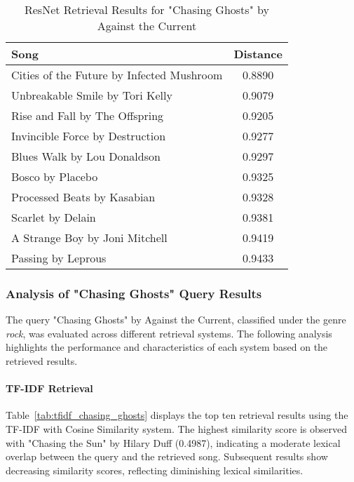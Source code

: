 \documentclass[sigconf]{acmart}
\begin{document}
\begin{table}[ht]
    \centering
    \caption{ResNet Retrieval Results for "Chasing Ghosts" by Against the Current}
    \label{tab:resnet_chasing_ghosts}
    \begin{tabular}{lc}
        \toprule
        \textbf{Song}                        & \textbf{Distance} \\
        \midrule
        Cities of the Future by Infected Mushroom & 0.8890                      \\
        Unbreakable Smile by Tori Kelly           & 0.9079                      \\
        Rise and Fall by The Offspring            & 0.9205                      \\
        Invincible Force by Destruction           & 0.9277                      \\
        Blues Walk by Lou Donaldson                & 0.9297                      \\
        Bosco by Placebo                           & 0.9325                      \\
        Processed Beats by Kasabian                & 0.9328                      \\
        Scarlet by Delain                          & 0.9381                      \\
        A Strange Boy by Joni Mitchell             & 0.9419                      \\
        Passing by Leprous                          & 0.9433                      \\
        \bottomrule
    \end{tabular}
\end{table}

\subsubsection{Analysis of "Chasing Ghosts" Query Results}

The query "Chasing Ghosts" by Against the Current, classified under the genre \textit{rock}, was evaluated across different retrieval systems. The following analysis highlights the performance and characteristics of each system based on the retrieved results.

\paragraph{TF-IDF Retrieval}

Table~\ref{tab:tfidf_chasing_ghosts} displays the top ten retrieval results using the TF-IDF with Cosine Similarity system. The highest similarity score is observed with "Chasing the Sun" by Hilary Duff (0.4987), indicating a moderate lexical overlap between the query and the retrieved song. Subsequent results show decreasing similarity scores, reflecting diminishing lexical similarities.
\end{document}
